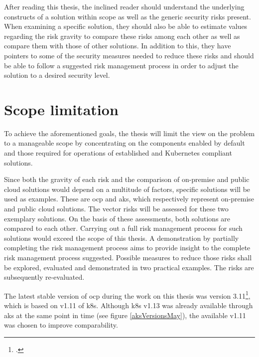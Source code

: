 After reading this thesis, the inclined reader should understand the underlying constructs of a solution within scope as well as the generic security risks present. When examining a specific solution, they should also be able to estimate values regarding the risk gravity to compare these risks among each other as well as compare them with those of other solutions. In addition to this, they have pointers to some of the security measures needed to reduce these risks and should be able to follow a suggested risk management process in order to adjust the solution to a desired security level.

\section{Scope limitation} \label{scopeLimit}

To achieve the aforementioned goals, the thesis will limit the view on the problem to a manageable scope by
concentrating on the components enabled by default and those required for operations of established and Kubernetes compliant solutions.

Since both the gravity of each risk and the comparison of on-premise and public cloud solutions would depend on a multitude of factors, specific solutions will be used as examples. These are \gls{ocp} and \gls{aks}, which respectively represent on-premise and public cloud solutions.
The vector risks will be assessed for these two exemplary solutions.
On the basis of these assessments, both solutions are compared to each other.
Carrying out a full risk management process for such solutions would exceed the scope of this thesis.
A demonstration by partially completing the risk management process aims to provide insight to the complete risk management process suggested.
Possible measures to reduce those risks shall be explored, evaluated and demonstrated in two practical examples.
The risks are subsequently re-evaluated.

The latest stable version of \gls{ocp} during the work on this thesis was version 3.11\footcite[][, see headline and date]{ocpRelease}, which is based on v1.11 of \gls{k8s}.
Although \gls{k8s} v1.13 was already available through \gls{aks} at the same point in time (see figure \ref{aksVersionsMay}), the available v1.11 was chosen to improve comparability.

